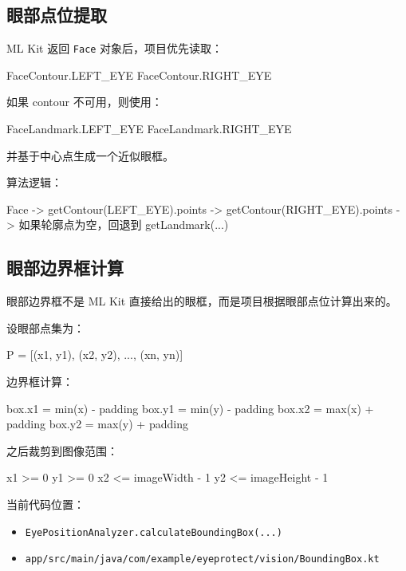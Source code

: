 \documentclass[UTF8,a4paper,11pt]{ctexart}
\begin{document}
\subsection{眼部点位提取}

ML Kit 返回 \texttt{Face} 对象后，项目优先读取：

\begin{code}
FaceContour.LEFT_EYE
FaceContour.RIGHT_EYE
\end{code}

如果 contour 不可用，则使用：

\begin{code}
FaceLandmark.LEFT_EYE
FaceLandmark.RIGHT_EYE
\end{code}

并基于中心点生成一个近似眼框。

算法逻辑：

\begin{code}
Face
  -> getContour(LEFT_EYE).points
  -> getContour(RIGHT_EYE).points
  -> 如果轮廓点为空，回退到 getLandmark(...)
\end{code}

\subsection{眼部边界框计算}

眼部边界框不是 ML Kit 直接给出的眼框，而是项目根据眼部点位计算出来的。

设眼部点集为：

\begin{code}
P = [(x1, y1), (x2, y2), ..., (xn, yn)]
\end{code}

边界框计算：

\begin{code}
box.x1 = min(x) - padding
box.y1 = min(y) - padding
box.x2 = max(x) + padding
box.y2 = max(y) + padding
\end{code}

之后裁剪到图像范围：

\begin{code}
x1 >= 0
y1 >= 0
x2 <= imageWidth - 1
y2 <= imageHeight - 1
\end{code}

当前代码位置：

\begin{itemize}
  \item \texttt{EyePositionAnalyzer.calculateBoundingBox(...)}
  \item \texttt{app/src/main/java/com/example/eyeprotect/vision/BoundingBox.kt}
\end{itemize}
\end{document}
